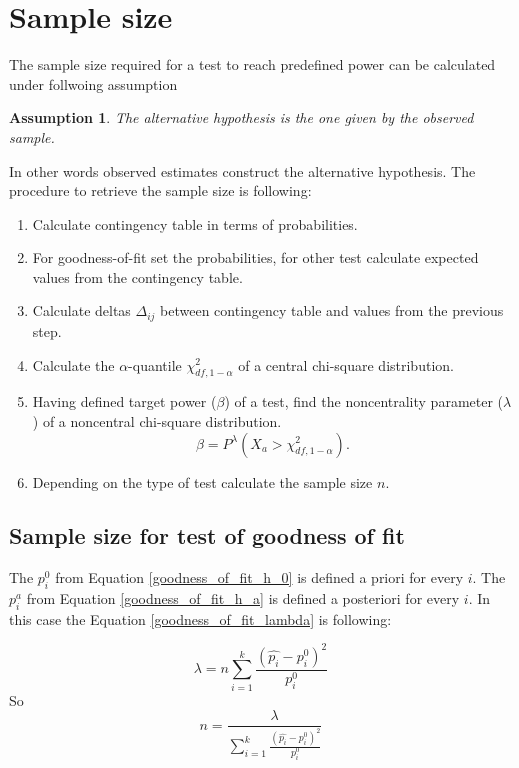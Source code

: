 \documentclass{article}
\newtheorem{assumption}{Assumption}
\begin{document}
\section{Sample size}
The sample size required for a test to reach predefined power can be calculated
under follwoing assumption 

\begin{assumption}
The alternative hypothesis is the one given by the observed sample. 
\end{assumption} 
In other words observed estimates construct the alternative hypothesis. The 
procedure to retrieve the sample size is following:

\begin{enumerate}
    \item Calculate contingency table in terms of probabilities.
    \item For goodness-of-fit set the probabilities, for other test calculate expected values from the contingency table.
    \item Calculate deltas $\Delta_{ij}$ between contingency table and values from the previous step.
    \item Calculate the $\alpha$-quantile $\chi^2_{df,1-\alpha}$ of a central chi-square distribution.
    \item Having defined target power ($\beta$) of a test, find the noncentrality parameter ($\lambda$) of a noncentral chi-square distribution.
    \begin{equation}
        \beta = P^\lambda\left(X_a > \chi^2_{df,1-\alpha} \right).
    \end{equation}
    \item Depending on the type of test calculate the sample size $n$.
\end{enumerate}


\subsection{Sample size for test of goodness of fit}
The $p_i^0$ from Equation \ref{goodness_of_fit_h_0} is defined a priori for every $i$.
The $p_i^a$ from Equation \ref{goodness_of_fit_h_a} is defined a posteriori for every $i$.
In this case the Equation \ref{goodness_of_fit_lambda} is following:

\begin{equation}
    \lambda = n \sum_{i=1}^k \frac{\left(\widehat{p_{i}}-p_{i}^0\right)^2}{p_{i}^0}
\end{equation}
So
\begin{equation}
    n = \frac{\lambda}{\sum_{i=1}^k \frac{\left(\widehat{p_{i}}-p_{i}^0\right)^2}{p_{i}^0}}
\end{equation}
\end{document}

